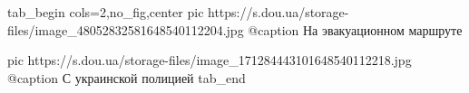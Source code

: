  
 
 
 
 

\ifcmt
  tab_begin cols=2,no_fig,center
     pic https://s.dou.ua/storage-files/image_48052832581648540112204.jpg
		 @caption На эвакуационном маршруте

		 pic https://s.dou.ua/storage-files/image_171284443101648540112218.jpg
		 @caption С украинской полицией
  tab_end
\fi
